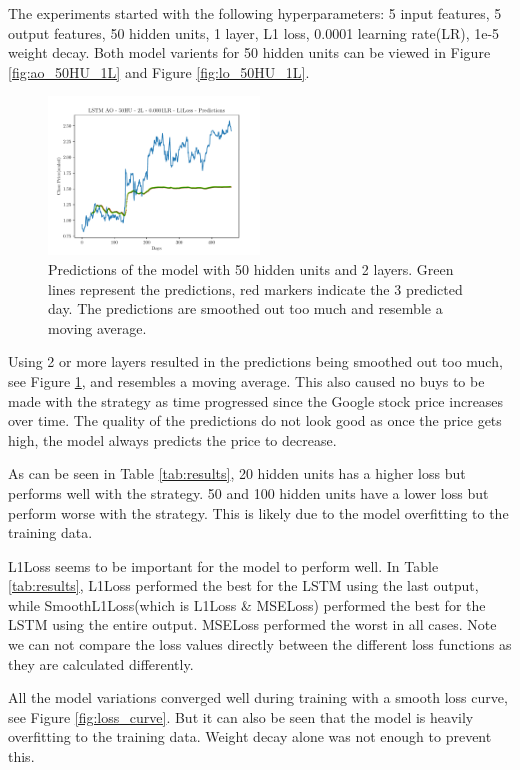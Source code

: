 The experiments started with the following hyperparameters: 5 input features, 5 output features, 50 hidden units, 1 layer, L1 loss, 0.0001 learning rate(LR), 1e-5 weight decay. Both model varients for 50 hidden units can be viewed in Figure \ref{fig:ao_50HU_1L} and Figure \ref{fig:lo_50HU_1L}.

\begin{figure}[h]
    \centering
    \includegraphics[width=0.5\textwidth, trim=20 0 20 10, clip]{plots/LSTM AO - 50HU - 2L - 0.0001LR - L1Loss-predictions.pdf}
    \caption{Predictions of the model with 50 hidden units and 2 layers. Green lines represent the predictions, red markers indicate the 3 predicted day. The predictions are smoothed out too much and resemble a moving average.}
    \label{fig:smoothed_out}
\end{figure}

Using 2 or more layers resulted in the predictions being smoothed out too much, see Figure \ref{fig:smoothed_out}, and resembles a moving average. This also caused no buys to be made with the strategy as time progressed since the Google stock price increases over time. The quality of the predictions do not look good as once the price gets high, the model always predicts the price to decrease.

As can be seen in Table \ref{tab:results}, 20 hidden units has a higher loss but performs well with the strategy. 50 and 100 hidden units have a lower loss but perform worse with the strategy. This is likely due to the model overfitting to the training data.

L1Loss seems to be important for the model to perform well. In Table \ref{tab:results}, L1Loss performed the best for the LSTM using the last output, while SmoothL1Loss(which is L1Loss \& MSELoss) performed the best for the LSTM using the entire output. MSELoss performed the worst in all cases. Note we can not compare the loss values directly between the different loss functions as they are calculated differently.

All the model variations converged well during training with a smooth loss curve, see Figure \ref{fig:loss_curve}. But it can also be seen that the model is heavily overfitting to the training data. Weight decay alone was not enough to prevent this.

